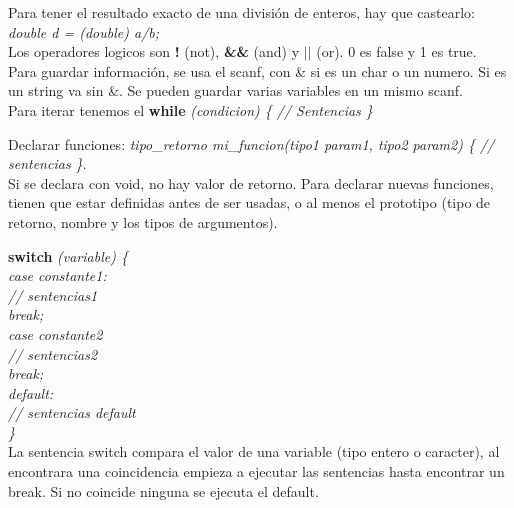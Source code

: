 \documentclass[11pt,a4paper]{article}
\begin{document}
Para tener el resultado exacto de una divisi\'on de enteros, hay que castearlo: \textit{double d = (double) a/b;}\\

Los operadores logicos son \textbf{!} (not), \textbf{\&\&} (and) y \textbf{$||$} (or). 0 es false y 1 es true.\\

Para guardar informaci\'on, se usa el scanf, con \& si es un char o un numero. Si es un string va sin \&. Se pueden guardar varias variables en un mismo scanf.\\

Para iterar tenemos el \textbf{while} \textit{(condicion) \{ // Sentencias \}}

Declarar funciones: \textit{tipo\_retorno mi\_funcion(tipo1 param1, tipo2 param2) \{ // sentencias \}}.\\ Si se declara con void, no hay valor de retorno. Para declarar nuevas funciones, tienen que estar definidas antes de ser usadas, o al menos el prototipo (tipo de retorno, nombre y los tipos de argumentos).\\

\begin{multicols}{2}
\textbf{switch} \textit{(variable) \{ \\
case constante1: \\
\hspace*{1cm} // sentencias1\\
\hspace*{1cm}break;\\
case constante2\\
\hspace*{1cm}// sentencias2\\
\hspace*{1cm}break;\\
default:\\
\hspace*{1cm}// sentencias default\\
\}}\\

La sentencia switch compara el valor de una variable (tipo entero o caracter), al encontrara una coincidencia empieza a ejecutar las sentencias hasta encontrar un break. Si no coincide ninguna se ejecuta el default. \\\\\\\\ 
\end{multicols}
\end{document}
